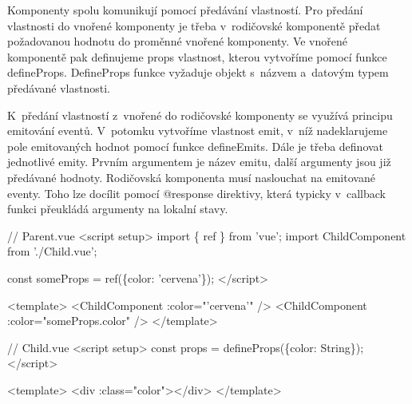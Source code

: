 Komponenty spolu komunikují pomocí předávání vlastností. 
Pro předání vlastnosti do vnořené komponenty je třeba v~rodičovské komponentě předat požadovanou hodnotu do proměnné vnořené komponenty. 
Ve vnořené komponentě pak definujeme props vlastnost, kterou vytvoříme pomocí funkce defineProps. 
DefineProps funkce vyžaduje objekt s~názvem a~datovým typem předávané vlastnosti.

K~předání vlastností z~vnořené do rodičovské komponenty se využívá principu emitování eventů. 
V~potomku vytvoříme vlastnost emit, v~níž nadeklarujeme pole emitovaných hodnot pomocí funkce defineEmits. Dále je třeba definovat jednotlivé emity. 
Prvním argumentem je název emitu, další argumenty jsou již předávané hodnoty. Rodičovská komponenta musí naslouchat na emitované eventy. 
Toho lze docílit pomocí @response direktivy, která typicky v~callback funkci přeukládá argumenty na lokalní stavy.\cite{vuemacrae,vue}







  


\begin{prog}
// Parent.vue
<script setup>
  import \{ ref \} from 'vue';
  import ChildComponent from './Child.vue';

  const someProps = ref(\{color: 'cervena'\});
</script>

<template>
  <ChildComponent :color="'cervena'" />
  <ChildComponent :color="someProps.color" />
</template>

// Child.vue
<script setup>
  const props = defineProps(\{color: String\});
</script>

<template>
  <div :class="color"></div>
</template>
\end{prog}

